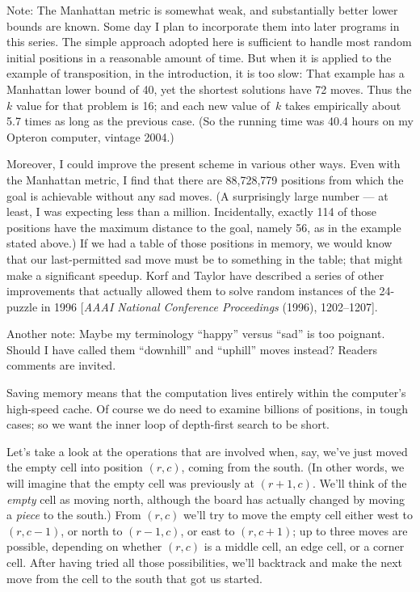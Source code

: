 Note: The Manhattan metric is somewhat weak, and substantially better
lower bounds are known. Some day I plan to incorporate them into
later programs in this series. The simple approach adopted here
is sufficient to handle most random initial positions in a reasonable
amount of time. But when it is applied to the example of transposition,
in the introduction, it is too slow: That example has a Manhattan
lower bound of 40, yet the shortest solutions have 72 moves. Thus
the $k$ value for that problem is 16; and each new value of~$k$
takes empirically about 5.7 times as long as the previous case.
(So the running time was 40.4 hours on my Opteron computer, vintage 2004.)

Moreover, I could improve the present scheme in various other ways.
Even with the Manhattan metric, I find that there are 88,728,779 positions
from which the goal is achievable without any sad moves. (A surprisingly
large number --- at least, I was expecting less than a million. Incidentally,
exactly 114 of those positions have the maximum distance to the goal,
namely 56, as in the example stated above.) If we had a
table of those positions in memory, we would know that our last-permitted
sad move must be to something in the table; that might make a
significant speedup. Korf and Taylor have described a series of
other improvements that actually
allowed them to solve random instances of the 24-puzzle in 1996
[{\sl AAAI National Conference Proceedings\/} (1996), 1202--1207].

Another note: Maybe my terminology ``happy'' versus ``sad'' is too
poignant. Should I have called them ``downhill'' and ``uphill'' moves
instead? Readers comments are invited.

\fi

Saving memory means that the computation lives entirely within the
computer's high-speed cache. Of course we do need to examine billions
of positions, in tough cases; so we want the inner loop of depth-first
search to be short.

Let's take a look at the operations that are
involved when, say, we've just moved the empty cell into position
$(r,c)$, coming from the south. (In other words, we will
imagine that the empty cell was
previously at $(r+1,c)$. We'll think of the {\it empty\/} cell as moving north,
although the board has actually changed by moving a {\it piece\/} to the
south.)
From $(r,c)$ we'll try to move the empty cell either west to $(r,c-1)$,
or north to $(r-1,c)$, or east to $(r,c+1)$;
up to three moves are possible, depending on whether $(r,c)$ is a middle cell,
an edge cell, or a corner cell. After having tried all those possibilities,
we'll backtrack and make the next move from the cell to the south
that got us started.

